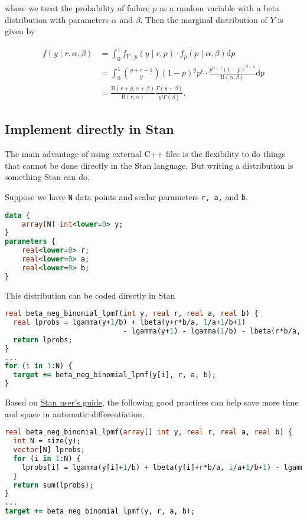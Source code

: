 \documentclass[11pt]{article}
\begin{document}
where we treat the probability of failure $p$ as a random variable with a beta distribution with parameters $\alpha$ and $\beta$. Then the marginal distribution of $Y$ is given by

\begin{equation}
  \begin{aligned}
  f(y \mid r, \alpha ,\beta) &=\int_{0}^{1} f_{Y \mid p}(y \mid r,p) \cdot f_{p}(p \mid \alpha ,\beta )\mathrm {d} p \\
  &=\int_{0}^{1} {\binom {y+r-1}{y}} (1-p)^{y} p^{r} \cdot {\frac {p^{\alpha -1}(1-p)^{\beta -1}}{\mathrm{B} (\alpha ,\beta )}} \mathrm{d}p \\
  &= {\frac {\mathrm{B} (r+y,\alpha +\beta )}{\mathrm{B} (r,\alpha )}}{\frac {\Gamma (y+\beta )}{y! \Gamma (\beta )}}.
  \end{aligned}
\end{equation}





\subsection{Implement directly in Stan}

The main advantage of using external C++ files is the flexibility to do things that cannot be done directly in the Stan language. But writing a distribution is something Stan can do.

Suppose we have \verb|N| data points and scalar parameters \verb|r, a,| and \verb|b|.
\begin{lstlisting}[language=Stan, style=lgeneral]
data {
	array[N] int<lower=0> y;
}
parameters {
	real<lower=0> r;
	real<lower=0> a;
	real<lower=0> b;
}
\end{lstlisting}


This distribution can be coded directly in Stan
\begin{lstlisting}[language=Stan, style=lgeneral]
real beta_neg_binomial_lpmf(int y, real r, real a, real b) {
  real lprobs = lgamma(y+1/b) + lbeta(y+r*b/a, 1/a+1/b+1)
  							- lgamma(y+1) - lgamma(1/b) - lbeta(r*b/a, 1/a+1);
  return lprobs;
}
...
for (i in 1:N) {
  target += beta_neg_binomial_lpmf(y[i], r, a, b);
}
\end{lstlisting}
Based on \href{https://mc-stan.org/docs/stan-users-guide/vectorization.html}{Stan user's guide}, the following good practices can help save more time and space in automatic differentiation.
\begin{lstlisting}[language=Stan, style=lgeneral]
real beta_neg_binomial_lpmf(array[] int y, real r, real a, real b) {
  int N = size(y);
  vector[N] lprobs;
  for (i in 1:N) {
    lprobs[i] = lgamma(y[i]+1/b) + lbeta(y[i]+r*b/a, 1/a+1/b+1) - lgamma(y[i]+1) - lgamma(1/b) - lbeta(r*b/a, 1/a+1);
  }
  return sum(lprobs);
}
...
target += beta_neg_binomial_lpmf(y, r, a, b);
\end{lstlisting}
\end{document}
